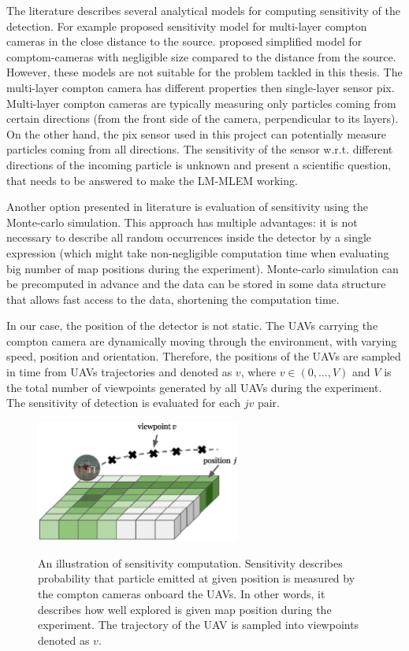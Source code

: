 The literature describes several analytical models for computing sensitivity of the detection. 
For example \cite{wilderman2001} proposed sensitivity model for multi-layer compton cameras in the close distance to the source.
\cite{maxim2016} proposed simplified model for comptom-cameras with negligible size compared to the distance from the source.
However, these models are not suitable for the problem tackled in this thesis.
The multi-layer compton camera has different properties then single-layer sensor \ac{pix}.
Multi-layer compton cameras are typically measuring only particles coming from certain directions (from the front side of the camera, perpendicular to its layers).
On the other hand, the \ac{pix} sensor used in this project can potentially measure particles coming from all directions.
The sensitivity of the sensor w.r.t. different directions of the incoming particle is unknown and present a scientific question, that needs to be answered to make the \ac{LM-MLEM} working. 

Another option presented in literature is evaluation of sensitivity using the Monte-carlo simulation.
This approach has multiple advantages: it is not necessary to describe all random occurrences inside the detector by a single expression (which might take non-negligible computation time when evaluating big number of map positions during the experiment).
Monte-carlo simulation can be precomputed in advance and the data can be stored in some data structure that allows fast access to the data, shortening the computation time.

In our case, the position of the detector is not static. 
The \ac{UAV}s carrying the compton camera are dynamically moving through the environment, with varying speed, position and orientation.
Therefore, the positions of the \ac{UAV}s are sampled in time from \ac{UAV}s trajectories and denoted as $v$, where $v \in (0, \dots , V)$ and $V$ is the total number of viewpoints generated by all \ac{UAV}s during the experiment.
The sensitivity of detection is evaluated for each $jv$ pair. %

\begin{figure}[!h]
  \centering
    \includegraphics[width=0.6\textwidth]{./fig/photos/sen.eps}
    \label{fig:sen_illustration}
  \caption{An illustration of sensitivity computation. Sensitivity describes probability that particle emitted at given position is measured by the compton cameras onboard the \ac{UAV}s. In other words, it describes how well explored is given map position during the experiment. The trajectory of the \ac{UAV} is sampled into viewpoints denoted as $v$.}
\end{figure}%

